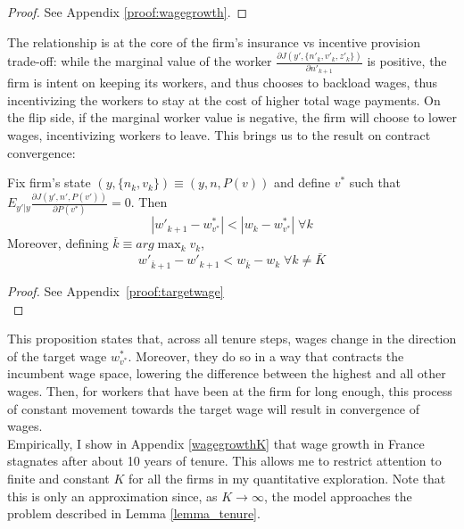 \begin{proof}
  See Appendix \ref{proof:wagegrowth}.
\end{proof}
The relationship is at the core of the firm's insurance vs incentive provision trade-off: while the marginal value of the worker $\frac{\partial J(y',\{n'_k,v'_k,z'_k\})}{\partial n'_{k+1}}$ is positive, the firm is intent on keeping its workers, and thus chooses to backload wages, thus incentivizing the workers to stay at the cost of higher total wage payments. On the flip side, if the marginal worker value is negative, the firm will choose to lower wages, incentivizing workers to leave. This brings us to the result on contract convergence:
\begin{proposition} \label{prop:targetwage}
 Fix firm's state $(y,\{n_k,v_k\})\equiv (y,n,P(v))$ and define $v^*$ such that \\ 
 $E_{y'|y}\frac{\partial J(y',n',P(v'))}{\partial P(v^*)}=0$. Then
  \[ |w'_{k+1}-w^*_{v^*}|<|w_k-w^*_{v^*}| \; \forall k\]
 Moreover, defining $\bar{k}\equiv arg\max_k v_k$,
 \[ w'_{\bar{k}+1}-w'_{k+1}<w_{\bar{k}}-w_k \; \forall k\neq\bar{K}\]
 
\end{proposition}
\begin{proof}
  See Appendix~\ref{proof:targetwage} \\

\end{proof}
This proposition states that, across all tenure steps, wages change in the direction of the target wage $w^*_{v^*}$. Moreover, they do so in a way that contracts the incumbent wage space, lowering the difference between the highest and all other wages. Then, for workers that have been at the firm for long enough, this process of constant movement towards the target wage will result in convergence of wages. \\
Empirically, I show in Appendix \ref{wagegrowthK} that wage growth in France stagnates after about 10 years of tenure.  This allows me to restrict attention to finite and constant $K$ for all the firms in my quantitative exploration. Note that this is only an approximation since, as $K\rightarrow\infty$, the model approaches the problem described in Lemma \ref{lemma_tenure}.
